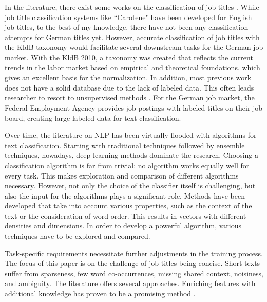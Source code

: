 \documentclass[12pt, a4paper, titlepage]{article}
\begin{document}
In the literature, there exist some works on the classification of job titles \citep{zhu2016, javed2015, decorte2021, wang2019,neculoiu2016}. While job title classification systems like ``Carotene" \citep{javed2015} have been developed for English job titles, to the best of my knowledge, there have not been any classification attempts for German titles yet. However, accurate classification of job titles with the \ac{KldB} taxonomy would facilitate several downstream tasks for the German job market. With the \ac{KldB} 2010, a taxonomy was created that reflects the current trends in the labor market based on empirical and theoretical foundations, which gives an excellent basis for the normalization. In addition, most previous work does not have a solid database due to the lack of labeled data. This often leads researcher to resort to unsupervised methods \citep{decorte2021, javed2015}. For the German job market, the Federal Employment Agency provides job postings with labeled titles on their job board, creating large labeled data for text classification. 

Over time, the literature on \ac{NLP} has been virtually flooded with algorithms for text classification. Starting with traditional techniques followed by ensemble techniques, nowadays, deep learning methods dominate the research. Choosing a classification algorithm is far from trivial: no algorithm works equally well for every task. This makes exploration and comparison of different algorithms necessary. However, not only the choice of the classifier itself is challenging, but also the input for the algorithms plays a significant role. Methods have been developed that take into account various properties, such as the context of the text or the consideration of word order. This results in vectors with different densities and dimensions. In order to develop a powerful algorithm, various techniques have to be explored and compared.

Task-specific requirements necessitate further adjustments in the training process. The focus of this paper is on the challenge of job titles being concise. Short texts suffer from sparseness, few word co-occurrences,  missing shared context, noisiness, and ambiguity. The literature offers several approaches. Enriching features with additional knowledge has proven to be a promising method \citep{WangF2014, wang2017J}.
\end{document}
